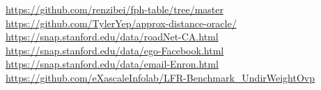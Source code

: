 \documentclass{article}
\begin{document}
\begin{thebibliography}{9}
     \url{https://github.com/renzibei/fph-table/tree/master}
     \url{https://github.com/TylerYep/approx-distance-oracle/}
     \url{https://snap.stanford.edu/data/roadNet-CA.html}
     \url{https://snap.stanford.edu/data/ego-Facebook.html}
     \url{https://snap.stanford.edu/data/email-Enron.html}
     \url{https://github.com/eXascaleInfolab/LFR-Benchmark_UndirWeightOvp}
\end{thebibliography}
\end{document}
